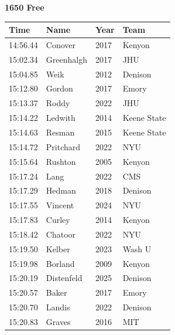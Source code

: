 \noindent\begin{minipage}[t]{0.98\textwidth}
\centering
\textbf{\textcolor{teamprimary}{1650 Free}}\par
\vspace{0.5em}
\centering
\small
\renewcommand{\arraystretch}{1.0}
\setlength{\tabcolsep}{4pt}
\begin{tabular}{@{}p{2.5cm}p{4.5cm}p{1.5cm}p{2.5cm}@{}}
\toprule
\textbf{Time} & \textbf{Name} & \textbf{Year} & \textbf{Team} \\
\midrule
14:56.44 & Conover & 2017 & Kenyon \\
15:02.34 & Greenhalgh & 2017 & JHU \\
15:04.85 & Weik & 2012 & Denison \\
15:12.80 & Gordon & 2017 & Emory \\
15:13.37 & Roddy & 2022 & JHU \\
15:14.22 & Ledwith & 2014 & Keene State \\
15:14.63 & Resman & 2015 & Keene State \\
15:14.72 & Pritchard & 2022 & NYU \\
15:15.64 & Rushton & 2005 & Kenyon \\
15:17.24 & Lang & 2022 & CMS \\
15:17.29 & Hedman & 2018 & Denison \\
15:17.55 & Vincent & 2024 & NYU \\
15:17.83 & Curley & 2014 & Kenyon \\
15:18.42 & Chatoor & 2022 & NYU \\
15:19.50 & Kelber & 2023 & Wash U \\
15:19.98 & Borland & 2009 & Kenyon \\
15:20.19 & Distenfeld & 2025 & Denison \\
15:20.57 & Baker & 2017 & Emory \\
15:20.70 & Landis & 2022 & Denison \\
15:20.83 & Graves & 2016 & MIT \\
\bottomrule
\end{tabular}
\end{minipage}
\vspace{1.2em}
